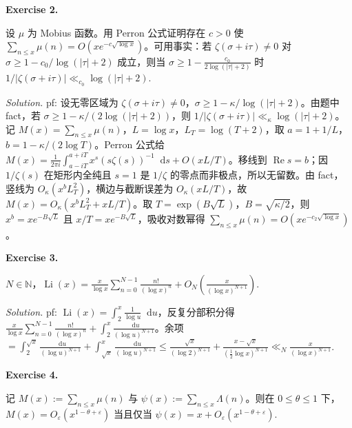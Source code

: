 \documentclass[
	colors = true,
	geometry = b5,
	fontsetup = font-setup-overleaf.tex,
	titlesetup = titles-setup.tex
]{AJbook}
\newenvironment{sheetexercise}[1]{%
	\par\medskip
	\noindent\textbf{Exercise #1.}\enspace
}{%
	\par\smallskip
}
\newenvironment{solution}{%
	\par\smallskip
	\noindent\textit{Solution.}\enspace
}{%
	\par\smallskip
}
\providecommand{\dd}{\mathop{}\!\mathrm d}
\begin{document}
\begin{sheetexercise}{2}
设 $\mu$ 为 Mobius 函数。用 Perron 公式证明存在 $c>0$ 使 $\sum_{n\leq x}\mu(n)=O(xe^{-c\sqrt{\log x}})$。可用事实：若 $\zeta(\sigma+i\tau)\neq0$ 对 $\sigma\geq1-c_0/\log(|\tau|+2)$ 成立，则当 $\sigma\geq1-\frac{c_0}{2\log(|\tau|+2)}$ 时 $1/|\zeta(\sigma+i\tau)|\ll_{c_0}\log(|\tau|+2)$.
\end{sheetexercise}
\begin{solution}pf: 设无零区域为 $\zeta(\sigma+i\tau)\neq0$，$\sigma\geq1-\kappa/\log(|\tau|+2)$。由题中 fact，若 $\sigma\geq1-\kappa/(2\log(|\tau|+2))$，则 $1/|\zeta(\sigma+i\tau)|\ll_\kappa\log(|\tau|+2)$。记 $M(x)=\sum_{n\leq x}\mu(n)$，$L=\log x$，$L_T=\log(T+2)$，取 $a=1+1/L$，$b=1-\kappa/(2\log T)$。Perron 公式给 $M(x)=\frac1{2\pi i}\int_{a-iT}^{a+iT}x^s(s\zeta(s))^{-1}\dd s+O(xL/T)$。移线到 $\operatorname{Re}s=b$；因 $1/\zeta(s)$ 在矩形内全纯且 $s=1$ 是 $1/\zeta$ 的零点而非极点，所以无留数。由 fact，竖线为 $O_\kappa(x^bL_T^2)$，横边与截断误差为 $O_\kappa(xL/T)$，故 $M(x)=O_\kappa(x^bL_T^2+xL/T)$。取 $T=\exp(B\sqrt L)$，$B=\sqrt{\kappa/2}$，则 $x^b=xe^{-B\sqrt L}$ 且 $x/T=xe^{-B\sqrt L}$，吸收对数幂得 $\sum_{n\leq x}\mu(n)=O(xe^{-c_2\sqrt{\log x}})$。\end{solution}
\begin{sheetexercise}{3}
$N\in\mathbb N$，$\operatorname{Li}(x)=\frac{x}{\log x}\sum_{n=0}^{N-1}\frac{n!}{(\log x)^n}+O_N(\frac{x}{(\log x)^{N+1}})$.
\end{sheetexercise}
\begin{solution}pf: $\operatorname{Li}(x)=\int_2^x\frac1{\log u}\dd u$，反复分部积分得 $\frac{x}{\log x}\sum_{n=0}^{N-1}\frac{n!}{(\log x)^n}+\int_2^x\frac{\dd u}{(\log u)^{N+1}}$。余项 $=\int_2^{\sqrt x}\frac{\dd u}{(\log u)^{N+1}}+\int_{\sqrt x}^x\frac{\dd u}{(\log u)^{N+1}}\leq\frac{\sqrt x}{(\log2)^{N+1}}+\frac{x-\sqrt x}{(\frac12\log x)^{N+1}}\ll_N\frac{x}{(\log x)^{N+1}}$.\end{solution}
\begin{sheetexercise}{4}
记 $M(x):=\sum_{n\leq x}\mu(n)$ 与 $\psi(x):=\sum_{n\leq x}\Lambda(n)$。则在 $0\leq\theta\leq1$ 下，$M(x)=O_\varepsilon(x^{1-\theta+\varepsilon})$ 当且仅当 $\psi(x)=x+O_\varepsilon(x^{1-\theta+\varepsilon})$.
\end{sheetexercise}
\end{document}
